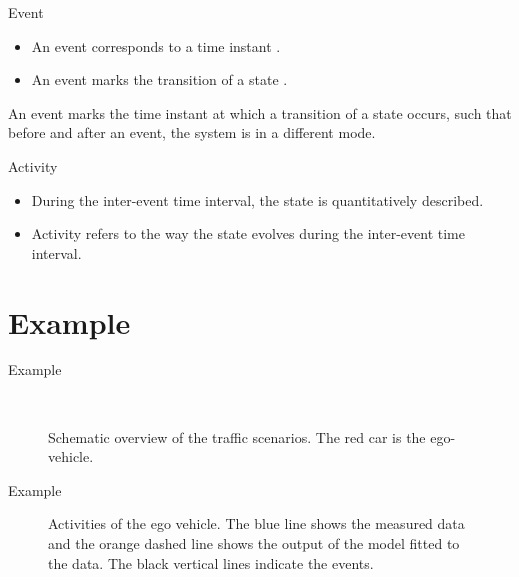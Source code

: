 \documentclass[aspectratio=\AspectR,10pt,compress,t]{beamer} %
\newlength\figurewidth
\newlength\figureheight
\begin{document}
\begin{frame}{Event}
	\begin{itemize}
		\item An event corresponds to a time instant \cite{breu1997towards, kim1993supervenience, sartori1996understanding, branicky1998hybridcontrol, boel1999hybridcontrol, heemels2012eventcontrol}.
		\item An event marks the transition of a state \cite{deGelder2017assessment}.
	\end{itemize}
	\begin{definition}[Event]
		An event marks the time instant at which a transition of a state occurs, such that before and after an event, the system is in a different mode.
	\end{definition}
\end{frame}

\begin{frame}{Activity}
	\begin{itemize}
		\item During the inter-event time interval, the state is quantitatively described.
		\item Activity refers to the way the state evolves during the inter-event time interval.
	\end{itemize}
\end{frame}

\section{Example}
\begin{frame}{Example}
	\vspace{-1em}
	\begin{figure}
		\centering
		\setlength\figureheight{106pt}
		\setlength\figurewidth{260pt}
		\\
		\setlength\figureheight{100pt}
		\caption{Schematic overview of the traffic scenarios. The red car is the ego-vehicle.}
	\end{figure}
\end{frame}

\begin{frame}{Example}
	\vspace{-1em}
	\begin{figure}
		\centering
		\setlength\figureheight{150pt}
		\setlength\figurewidth{248pt}
		
		\caption{Activities of the ego vehicle. The blue line shows the measured data and the orange dashed line shows the output of the model fitted to the data. The black vertical lines indicate the events.}
	\end{figure}
\end{frame}
\end{document}
